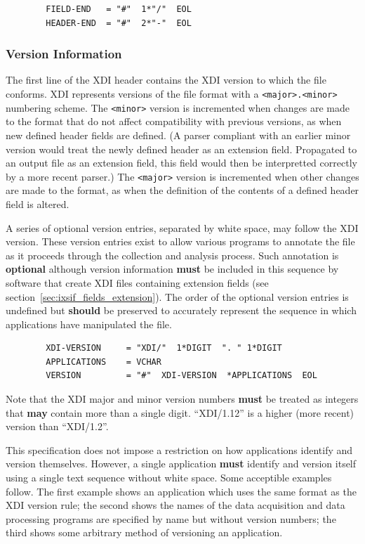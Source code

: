 \documentclass{article}
\newcommand{\xdi}{\textsf{XDI}}
\begin{document}
\begin{verbatim}
        FIELD-END   = "#"  1*"/"  EOL
        HEADER-END  = "#"  2*"-"  EOL
\end{verbatim}


\subsubsection{Version Information}
\label{sec:def_hdr_version}

The first line of the {\xdi} header contains the {\xdi} version to
which the file conforms.  {\xdi} represents versions of the file
format with a \texttt{<major>.<minor>} numbering scheme.  The
\texttt{<minor>} version is incremented when changes are made to the
format that do not affect compatibility with previous versions, as
when new defined header fields are defined.  (A parser compliant with
an earlier minor version would treat the newly defined header as an
extension field.  Propagated to an output file as an extension field,
this field would then be interpretted correctly by a more recent
parser.)  The \texttt{<major>} version is incremented when other
changes are made to the format, as when the definition of the contents
of a defined header field is altered.

A series of optional version entries, separated by white space, may
follow the {\xdi} version.  These version entries exist to allow
various programs to annotate the file as it proceeds through the
collection and analysis process. Such annotation is \textbf{optional}
although version information \textbf{must} be included in this
sequence by software that create {\xdi} files containing extension
fields (see section~\ref{sec:ixsif_fields_extension}).  The order of
the optional version entries is undefined but \textbf{should} be
preserved to accurately represent the sequence in which applications
have manipulated the file.

\begin{verbatim}
        XDI-VERSION     = "XDI/"  1*DIGIT  ". " 1*DIGIT
        APPLICATIONS    = VCHAR
        VERSION         = "#"  XDI-VERSION  *APPLICATIONS  EOL
\end{verbatim}

Note that the {\xdi} major and minor version numbers \textbf{must} be
treated as integers that \textbf{may} contain more than a single
digit.  ``XDI/1.12'' is a higher (more recent) version than
``XDI/1.2''.

This specification does not impose a restriction on how applications
identify and version themselves.  However, a single application
\textbf{must} identify and version itself using a single text sequence
without white space.  Some acceptible examples follow.  The first
example shows an application which uses the same format as the XDI
version rule; the second shows the names of the data acquisition and
data processing programs are specified by name but without version
numbers; the third shows some arbitrary method of versioning an
application.
\end{document}

